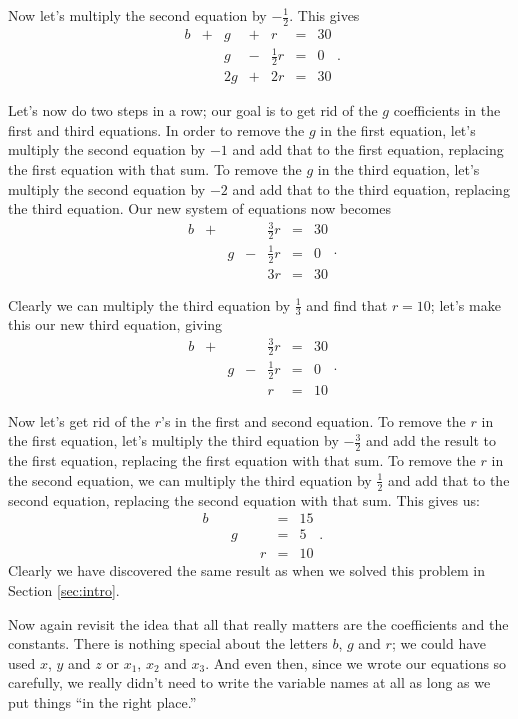 \renewcommand{\arraystretch}{1.2}
Now let's multiply the second equation by $-\frac12$. This gives $$\begin{array}{*{7}{r}}
b&+&g&+&r&=&30\\
 & & g&-&\frac{1}{2}r&=&0\\
 & &2g&+&2r&=&30
\end{array}.$$

Let's now do two steps in a row; our goal is to get rid of the $g$ coefficients in the first and third equations. In order to remove the $g$ in the first equation, let's multiply the second equation by $-1$ and add that to the first equation, replacing the first equation with that sum. To remove the $g$ in the third equation, let's multiply the second equation by $-2$ and add that to the third equation, replacing the third equation. Our new system of equations now becomes
$$\begin{array}{*{7}{r}}
b&+& & &\frac{3}{2}r&=&30\\
 & &g&-&\frac{1}{2}r&=&0\\
 & & & &3r&=&30
\end{array}.$$

Clearly we can multiply the third equation by $\frac13$ and find that $r=10$; let's make this our new third equation, giving
$$\begin{array}{*{7}{r}}
b&+& & &\frac{3}{2}r&=&30\\
 & &g&-&\frac{1}{2}r&=&0\\
 & & & &r&=&10
\end{array}.$$

Now let's get rid of the $r$'s in the first and second equation. To remove the $r$ in the first equation, let's multiply the third equation by $-\frac32$ and add the result to the first equation, replacing the first equation with that sum. To remove the $r$ in the second equation, we can multiply the third equation by $\frac12$ and add that to the second equation, replacing the second equation with that sum. This gives us:
$$\begin{array}{*{7}{r}}
b& & & & &=&15\\
 & &g& & &=&5\\
 & & & &r&=&10
\end{array}.$$
Clearly we have discovered the same result as when we solved this problem in Section \ref{sec:intro}. 

Now again revisit the idea that all that really matters are the coefficients and the constants. There is nothing special about the letters $b$, $g$ and $r$; we could have used $x$, $y$ and $z$ or $x_1$, $x_2$ and $x_3$. And even then, since we wrote our equations so carefully, we really didn't need to write the variable names at all as long as we put things ``in the right place.''

